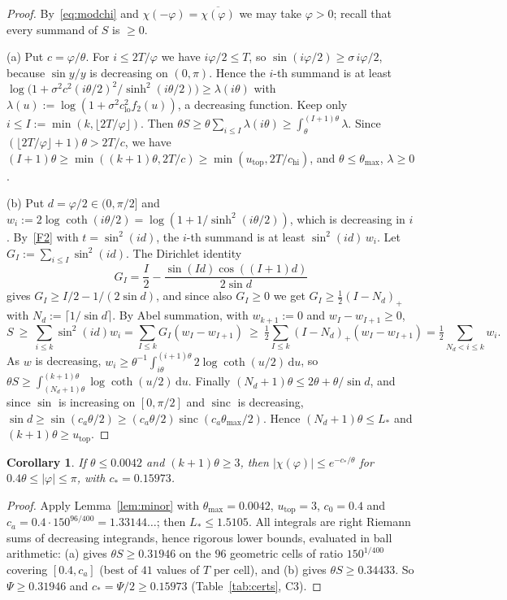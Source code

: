 \documentclass[11pt]{amsart}
\newtheorem{corollary}[theorem]{Corollary}
\theoremstyle{definition}
\theoremstyle{remark}
\numberwithin{equation}{section}
\newcommand{\sinc}{\operatorname{sinc}}
\newcommand{\dd}{\,\mathrm{d}}
\begin{document}
\begin{proof}
By~\eqref{eq:modchi} and $\chi(-\varphi)=\overline{\chi(\varphi)}$ we may take $\varphi>0$; recall that every summand of $S$ is $\ge0$.

(a) Put $c=\varphi/\theta$. For $i\le2T/\varphi$ we have $i\varphi/2\le T$, so $\sin(i\varphi/2)\ge\sigma\,i\varphi/2$, because $\sin y/y$ is
decreasing on $(0,\pi)$. Hence the $i$-th summand is at least
$\log\bigl(1+\sigma^2c^2(i\theta/2)^2/\sinh^2(i\theta/2)\bigr)\ge\lambda(i\theta)$ with $\lambda(u):=\log(1+\sigma^2c_{\mathrm{lo}}^2f_2(u))$,
a decreasing function. Keep only $i\le I:=\min(k,\lfloor2T/\varphi\rfloor)$. Then
$\theta S\ge\theta\sum_{i\le I}\lambda(i\theta)\ge\int_\theta^{(I+1)\theta}\lambda$. Since $(\lfloor2T/\varphi\rfloor+1)\theta>2T/c$, we have
$(I+1)\theta\ge\min((k+1)\theta,2T/c)\ge\min(u_{\mathrm{top}},2T/c_{\mathrm{hi}})$, and $\theta\le\theta_{\max}$, $\lambda\ge0$.

(b) Put $d=\varphi/2\in(0,\pi/2]$ and $w_i:=2\log\coth(i\theta/2)=\log(1+1/\sinh^2(i\theta/2))$, which is decreasing in $i$.
By~\ref{F2} with $t=\sin^2(id)$, the $i$-th summand is at least $\sin^2(id)\,w_i$. Let $G_I:=\sum_{i\le I}\sin^2(id)$. The Dirichlet
identity
\begin{equation}\label{eq:dirichlet}
  G_I=\frac I2-\frac{\sin(Id)\cos((I+1)d)}{2\sin d}
\end{equation}
gives $G_I\ge I/2-1/(2\sin d)$, and since also $G_I\ge0$ we get $G_I\ge\frac12(I-N_d)_+$ with $N_d:=\lceil1/\sin d\rceil$.
By Abel summation, with $w_{k+1}:=0$ and $w_I-w_{I+1}\ge0$,
\[
  S\ \ge\ \sum_{i\le k}\sin^2(id)w_i=\sum_{I\le k}G_I(w_I-w_{I+1})\ \ge\ \tfrac12\sum_{I\le k}(I-N_d)_+(w_I-w_{I+1})=\tfrac12\sum_{N_d<i\le k}w_i .
\]
As $w$ is decreasing, $w_i\ge\theta^{-1}\int_{i\theta}^{(i+1)\theta}2\log\coth(u/2)\dd u$, so
$\theta S\ge\int_{(N_d+1)\theta}^{(k+1)\theta}\log\coth(u/2)\dd u$. Finally $(N_d+1)\theta\le2\theta+\theta/\sin d$, and since $\sin$ is
increasing on $[0,\pi/2]$ and $\sinc$ is decreasing, $\sin d\ge\sin(c_a\theta/2)\ge(c_a\theta/2)\sinc(c_a\theta_{\max}/2)$. Hence
$(N_d+1)\theta\le L_\ast$ and $(k+1)\theta\ge u_{\mathrm{top}}$.
\end{proof}

\begin{corollary}\label{cor:cstar}
If $\theta\le0.0042$ and $(k+1)\theta\ge3$, then $|\chi(\varphi)|\le e^{-c_\ast/\theta}$ for $0.4\theta\le|\varphi|\le\pi$, with
$c_\ast=0.15973$.
\end{corollary}

\begin{proof}
Apply Lemma~\ref{lem:minor} with $\theta_{\max}=0.0042$, $u_{\mathrm{top}}=3$, $c_0=0.4$ and $c_a=0.4\cdot150^{96/400}=1.33144\ldots$;
then $L_\ast\le1.5105$. All integrals are right Riemann sums of decreasing integrands, hence rigorous lower bounds, evaluated in
ball arithmetic: (a) gives $\theta S\ge0.31946$ on the $96$ geometric cells of ratio $150^{1/400}$ covering $[0.4,c_a]$ (best of
$41$ values of $T$ per cell), and (b) gives
$\theta S\ge0.34433$. So $\Psi\ge0.31946$ and $c_\ast=\Psi/2\ge0.15973$ (Table~\ref{tab:certs}, C3).
\end{proof}
\end{document}
